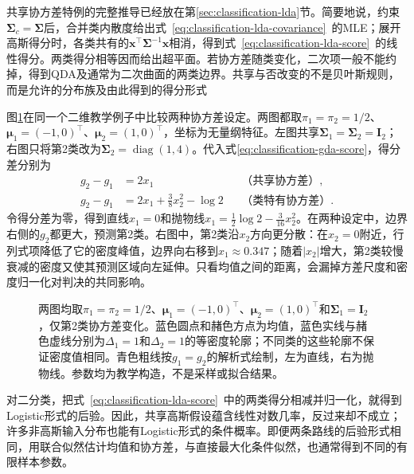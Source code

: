 共享协方差特例的完整推导已经放在第\ref{sec:classification-lda}节。简要地说，约束$\bm{\Sigma}_c=\bm{\Sigma}$后，合并类内散度给出式~\eqref{eq:classification-lda-covariance}~的MLE；展开高斯得分时，各类共有的$\bm{x}^{\top}\bm{\Sigma}^{-1}\bm{x}$相消，得到式~\eqref{eq:classification-lda-score}~的线性得分。两类得分相等因而给出超平面。若协方差随类变化，二次项一般不能约掉，得到QDA及通常为二次曲面的两类边界。共享与否改变的不是贝叶斯规则，而是允许的分布族及由此得到的得分形式

图\ref{fig:classification-gaussian-boundaries}在同一个二维教学例子中比较两种协方差设定。两图都取$\pi_1=\pi_2=1/2$、$\bm{\mu}_1=(-1,0)^{\top}$、$\bm{\mu}_2=(1,0)^{\top}$，坐标为无量纲特征。左图共享$\bm{\Sigma}_1=\bm{\Sigma}_2=\bm{I}_2$；右图只将第2类改为$\bm{\Sigma}_2=\operatorname{diag}(1,4)$。代入式\eqref{eq:classification-gda-score}，得分差分别为
\begin{equation}
  \label{eq:classification-gda-boundary-example}
  \begin{aligned}
    g_2-g_1&=2x_1
      &&\text{（共享协方差）},\\
    g_2-g_1&=2x_1+\frac38x_2^2-\log2
      &&\text{（类特有协方差）}.
  \end{aligned}
\end{equation}
令得分差为零，得到直线$x_1=0$和抛物线$x_1=\frac12\log2-\frac{3}{16}x_2^2$。在两种设定中，边界右侧的$g_2$都更大，预测第2类。右图中，第2类沿$x_2$方向更分散：在$x_2=0$附近，行列式项降低了它的密度峰值，边界向右移到$x_1\approx0.347$；随着$|x_2|$增大，第2类较慢衰减的密度又使其预测区域向左延伸。只看均值之间的距离，会漏掉方差尺度和密度归一化对判决的共同影响。
\begin{figure}[htbp]
  \centering
  
  \caption{两图均取$\pi_1=\pi_2=1/2$、$\bm{\mu}_1=(-1,0)^{\top}$、$\bm{\mu}_2=(1,0)^{\top}$和$\bm{\Sigma}_1=\bm{I}_2$，仅第2类协方差变化。蓝色圆点和赭色方点为均值，蓝色实线与赭色虚线分别为$\Delta_1=1$和$\Delta_2=1$的等密度轮廓；不同类的这些轮廓不保证密度值相同。青色粗线按$g_1=g_2$的解析式绘制，左为直线，右为抛物线。参数均为教学构造，不是采样或拟合结果。}
  \label{fig:classification-gaussian-boundaries}
\end{figure}

对二分类，把式~\eqref{eq:classification-lda-score}~中的两类得分相减并归一化，就得到Logistic形式的后验。因此，共享高斯假设蕴含线性对数几率，反过来却不成立；许多非高斯输入分布也能有Logistic形式的条件概率。即便两条路线的后验形式相同，用联合似然估计均值和协方差，与直接最大化条件似然，也通常得到不同的有限样本参数。

